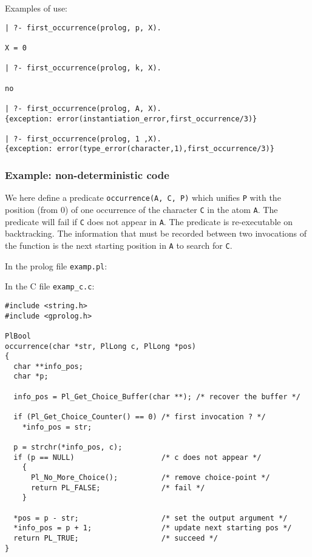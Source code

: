 
Examples of use:

\begin{Indentation}
\begin{verbatim}
| ?- first_occurrence(prolog, p, X).

X = 0

| ?- first_occurrence(prolog, k, X).

no

| ?- first_occurrence(prolog, A, X).
{exception: error(instantiation_error,first_occurrence/3)}

| ?- first_occurrence(prolog, 1 ,X).
{exception: error(type_error(character,1),first_occurrence/3)}
\end{verbatim}
\end{Indentation}

\subsubsection{Example: non-deterministic code}
We here define a predicate \texttt{occurrence(A, C, P)} which unifies
\texttt{P} with the position (from 0) of one occurrence of the character
\texttt{C} in the atom \texttt{A}. The predicate will fail if \texttt{C}
does not appear in \texttt{A}. The predicate is re-executable on
backtracking. The information that must be recorded between two invocations
of the function is the next starting position in \texttt{A} to search for
\texttt{C}.

In the prolog file \texttt{examp.pl}:


In the C file \texttt{examp\_c.c}:

\begin{Indentation}
\begin{verbatim}
#include <string.h>
#include <gprolog.h>

PlBool
occurrence(char *str, PlLong c, PlLong *pos)
{
  char **info_pos;
  char *p;

  info_pos = Pl_Get_Choice_Buffer(char **); /* recover the buffer */

  if (Pl_Get_Choice_Counter() == 0) /* first invocation ? */
    *info_pos = str;

  p = strchr(*info_pos, c);
  if (p == NULL)                    /* c does not appear */
    {
      Pl_No_More_Choice();          /* remove choice-point */
      return PL_FALSE;              /* fail */
    }

  *pos = p - str;                   /* set the output argument */
  *info_pos = p + 1;                /* update next starting pos */
  return PL_TRUE;                   /* succeed */
}
\end{verbatim}
\end{Indentation}

